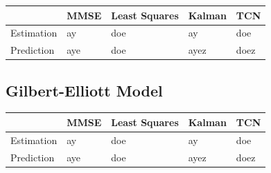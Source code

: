 \documentclass[twocolumn,letterpaper]{IEEEAerospaceCLS}  %
\begin{document}
\begin{table}[!h]
\begin{tabular}{|l|l|l|l|l|}
\hline
                            & MMSE                 & Least Squares        & Kalman         & TCN                   \\ \hline
\multirow{3}{*}{Estimation} & \multirow{3}{*}{ay}  & \multirow{3}{*}{doe} & \multirow{3}{*}{ay}   & \multirow{3}{*}{doe}  \\
                            &                      &                      &                       &                       \\
                            &                      &                      &                       &                       \\ \hline
\multirow{3}{*}{Prediction} & \multirow{3}{*}{aye} & \multirow{3}{*}{doe} & \multirow{3}{*}{ayez} & \multirow{3}{*}{doez} \\
                            &                      &                      &                       &                       \\
                            &                      &                      &                       &                       \\ \hline
\end{tabular}
\end{table}

\subsection{Gilbert-Elliott Model}

\begin{table}[!h]
\begin{tabular}{|l|l|l|l|l|}
\hline
                            & MMSE                 & Least Squares        & Kalman         & TCN                   \\ \hline
\multirow{3}{*}{Estimation} & \multirow{3}{*}{ay}  & \multirow{3}{*}{doe} & \multirow{3}{*}{ay}   & \multirow{3}{*}{doe}  \\
                            &                      &                      &                       &                       \\
                            &                      &                      &                       &                       \\ \hline
\multirow{3}{*}{Prediction} & \multirow{3}{*}{aye} & \multirow{3}{*}{doe} & \multirow{3}{*}{ayez} & \multirow{3}{*}{doez} \\
                            &                      &                      &                       &                       \\
                            &                      &                      &                       &                       \\ \hline
\end{tabular}
\end{table}
\end{document}
